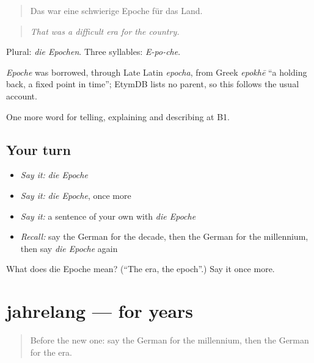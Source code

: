 \begin{quote}
Das war eine schwierige Epoche für das Land.
\end{quote}

\begin{quote}
\emph{That was a difficult era for the country.}
\end{quote}

Plural: \emph{die Epochen}. Three syllables: \emph{E-po-che}.

\begin{cousinweb}
\emph{Epoche} was borrowed, through Late Latin \emph{epocha}, from Greek \emph{epokhē} \textquotedblleft{}a holding back, a fixed point in time\textquotedblright{}; EtymDB lists no parent, so this follows the usual account.
\end{cousinweb}

\begin{grammarlens}[title={What you've built}]
One more word for telling, explaining and describing at B1.
\end{grammarlens}

\subsection*{Your turn}
\begin{itemize}
\raggedright
  \item \emph{Say it:} \emph{die Epoche}
  \item \emph{Say it:} \emph{die Epoche}, once more
  \item \emph{Say it:} a sentence of your own with \emph{die Epoche}
  \item \emph{Recall:} say the German for the decade, then the German for the millennium, then say \emph{die Epoche} again
\end{itemize}

\begin{tcolorbox}[breakable,colback=teal!4,colframe=teal!35!black,title={Before you move on}]
What does die Epoche mean? (\textquotedblleft{}The era, the epoch\textquotedblright{}.) Say it once more.
\end{tcolorbox}
\section[jahrelang]{jahrelang — for years}

\label{lesson:GE-C269-jahrelang}



\begin{quote}
Before the new one: say the German for the millennium, then the German for the era.
\end{quote}

